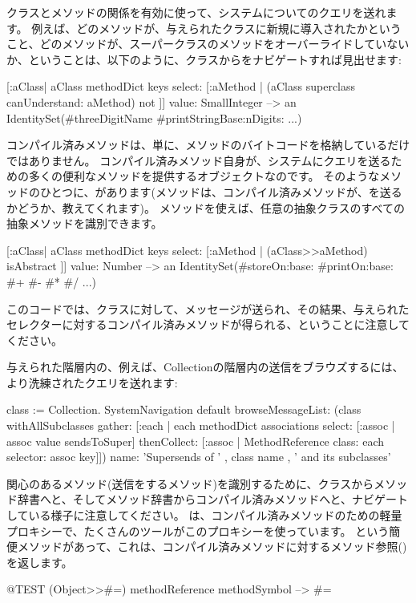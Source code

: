 \documentclass[a4paper,10pt,twoside]{book}
\begin{document}
クラスとメソッドの関係を有効に使って、システムについてのクエリを送れます。
例えば、どのメソッドが、与えられたクラスに新規に導入されたかということ、\ie どのメソッドが、スーパークラスのメソッドをオーバーライドしていないか、ということは、以下のように、クラスからをナビゲートすれば見出せます:
\begin{code}{}
[:aClass| aClass methodDict keys select: [:aMethod |
  (aClass superclass canUnderstand: aMethod) not ]] value: SmallInteger
  --> an IdentitySet(#threeDigitName #printStringBase:nDigits: ...)
\end{code}

コンパイル済みメソッドは、単に、メソッドのバイトコードを格納しているだけではありません。
コンパイル済みメソッド自身が、システムにクエリを送るための多くの便利なメソッドを提供するオブジェクトなのです。
そのようなメソッドのひとつに、があります(メソッドは、コンパイル済みメソッドが、を送るかどうか、教えてくれます)。
メソッドを使えば、任意の抽象クラスのすべての抽象メソッドを識別できます。
\begin{code}{}
[:aClass| aClass methodDict keys select: [:aMethod |
  (aClass>>aMethod) isAbstract ]] value: Number
  --> an IdentitySet(#storeOn:base: #printOn:base: #+ #- #* #/ ...)
\end{code}
このコードでは、クラスに対して、\ct{>>}メッセージが送られ、その結果、与えられたセレクターに対するコンパイル済みメソッドが得られる、ということに注意してください。


与えられた階層内の、例えば、Collectionの階層内の\super 送信をブラウズするには、より洗練されたクエリを送れます:
\begin{code}{}
class := Collection.
SystemNavigation default
  browseMessageList: (class withAllSubclasses gather: [:each |
    each methodDict associations
      select: [:assoc | assoc value sendsToSuper]
      thenCollect: [:assoc | MethodReference class: each selector: assoc key]])
  name: 'Supersends of ' , class name , ' and its subclasses'
\end{code}
関心のあるメソッド(\super 送信をするメソッド)を識別するために、クラスからメソッド辞書へと、そしてメソッド辞書からコンパイル済みメソッドへと、ナビゲートしている様子に注意してください。
は、コンパイル済みメソッドのための軽量プロキシーで、たくさんのツールがこのプロキシーを使っています。
という簡便メソッドがあって、これは、コンパイル済みメソッドに対するメソッド参照()を返します。
\begin{code}{@TEST}
(Object>>#=) methodReference methodSymbol --> #=
\end{code}
\end{document}
